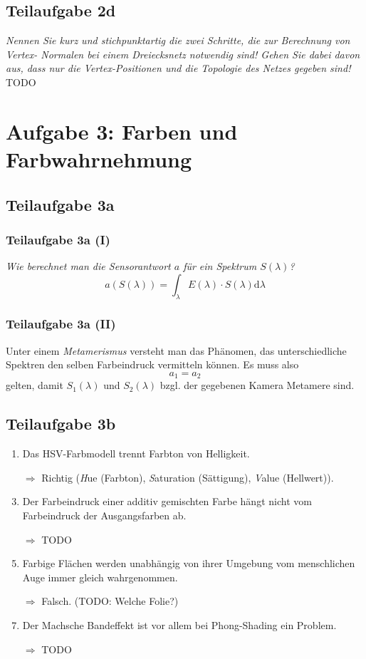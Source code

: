 \documentclass[a4paper]{scrartcl}
\begin{document}
\subsection*{Teilaufgabe 2d}
\textit{Nennen Sie kurz und stichpunktartig die zwei Schritte, die zur Berechnung von Vertex-
Normalen bei einem Dreiecksnetz notwendig sind! Gehen Sie dabei davon aus, dass nur
die Vertex-Positionen und die Topologie des Netzes gegeben sind!}
TODO

\clearpage
\section*{Aufgabe 3: Farben und Farbwahrnehmung}
\subsection*{Teilaufgabe 3a}
\subsubsection*{Teilaufgabe 3a (I)}
\textit{Wie berechnet man die Sensorantwort $a$ für ein Spektrum $S(\lambda)$?}
\[a(S(\lambda)) = \int_\lambda E(\lambda) \cdot S(\lambda) \mathrm{d} \lambda \]

\subsubsection*{Teilaufgabe 3a (II)}
Unter einem \textit{Metamerismus} versteht man das Phänomen, das
unterschiedliche Spektren den selben Farbeindruck vermitteln können. Es muss
also
\[a_1 = a_2\]
gelten, damit $S_1(\lambda)$ und $S_2(\lambda)$ bzgl. der gegebenen Kamera
Metamere sind.

\subsection*{Teilaufgabe 3b}
\begin{enumerate}
    \item Das HSV-Farbmodell trennt Farbton von Helligkeit.
    \item[$\Rightarrow$] Richtig (\textit{H}ue (Farbton), \textit{S}aturation (Sättigung),
                         \textit{V}alue (Hellwert)).
    \item Der Farbeindruck einer additiv gemischten Farbe hängt nicht vom Farbeindruck der Ausgangsfarben ab.
    \item[$\Rightarrow$] TODO
    \item Farbige Flächen werden unabhängig von ihrer Umgebung vom menschlichen Auge immer gleich wahrgenommen.
    \item[$\Rightarrow$] Falsch. (TODO: Welche Folie?)
    \item Der Machsche Bandeffekt ist vor allem bei Phong-Shading ein Problem.
    \item[$\Rightarrow$] TODO
\end{enumerate}
\end{document}
